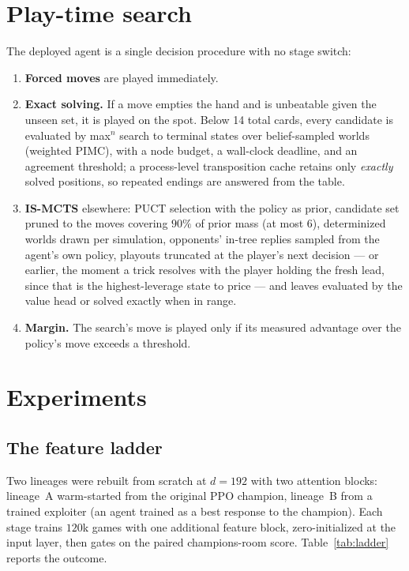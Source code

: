 \documentclass[11pt]{article}
\begin{document}
\section{Play-time search}

The deployed agent is a single decision procedure with no stage switch:

\begin{enumerate}
\item \textbf{Forced moves} are played immediately.
\item \textbf{Exact solving.} If a move empties the hand and is
  unbeatable given the unseen set, it is played on the spot. Below 14
  total cards, every candidate is evaluated by max$^n$ search to
  terminal states over belief-sampled worlds (weighted PIMC), with a
  node budget, a wall-clock deadline, and an agreement threshold; a
  process-level transposition cache retains only \emph{exactly} solved
  positions, so repeated endings are answered from the table.
\item \textbf{IS-MCTS} elsewhere: PUCT selection with the policy as
  prior, candidate set pruned to the moves covering $90\%$ of prior
  mass (at most 6), determinized worlds drawn per simulation,
  opponents' in-tree replies sampled from the agent's own policy,
  playouts truncated at the player's next decision --- or earlier, the
  moment a trick resolves with the player holding the fresh lead, since
  that is the highest-leverage state to price --- and leaves evaluated
  by the value head or solved exactly when in range.
\item \textbf{Margin.} The search's move is played only if its measured
  advantage over the policy's move exceeds a threshold.
\end{enumerate}

\section{Experiments}

\subsection{The feature ladder}
\label{sec:ladder}

Two lineages were rebuilt from scratch at $d=192$ with two attention
blocks: lineage~A warm-started from the original PPO champion,
lineage~B from a trained exploiter (an agent trained as a best response
to the champion). Each stage trains $120$k games with one additional
feature block, zero-initialized at the input layer, then gates on the
paired champions-room score. Table~\ref{tab:ladder} reports the
outcome.
\end{document}
